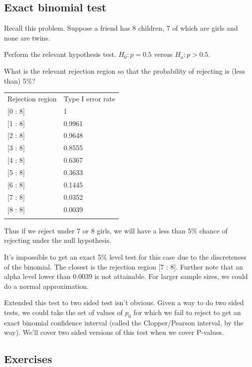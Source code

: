 \documentclass[]{article}
\begin{document}
\subsection{Exact binomial test}\label{exact-binomial-test}

Recall this problem. Suppose a friend has 8 children, 7 of which are
girls and none are twins.

Perform the relevant hypothesis test. $H_0 : p = 0.5$ versus
$H_a : p > 0.5$.

What is the relevant rejection region so that the probability of
rejecting is (less than) 5\%?

\begin{longtable}[c]{@{}ll@{}}
\toprule\addlinespace
Rejection region & Type I error rate
\\\addlinespace
\midrule\endhead
{[}0 : 8{]} & 1
\\\addlinespace
{[}1 : 8{]} & 0.9961
\\\addlinespace
{[}2 : 8{]} & 0.9648
\\\addlinespace
{[}3 : 8{]} & 0.8555
\\\addlinespace
{[}4 : 8{]} & 0.6367
\\\addlinespace
{[}5 : 8{]} & 0.3633
\\\addlinespace
{[}6 : 8{]} & 0.1445
\\\addlinespace
{[}7 : 8{]} & 0.0352
\\\addlinespace
{[}8 : 8{]} & 0.0039
\\\addlinespace
\bottomrule
\end{longtable}

Thus if we reject under 7 or 8 girls, we will have a less than 5\%
chance of rejecting under the null hypothesis.

It's impossible to get an exact 5\% level test for this case due to the
discreteness of the binomial. The closest is the rejection region {[}7 :
8{]}. Further note that an alpha level lower than 0.0039 is not
attainable. For larger sample sizes, we could do a normal approximation.

Extended this test to two sided test isn't obvious. Given a way to do
two sided tests, we could take the set of values of $p_0$ for which we
fail to reject to get an exact binomial confidence interval (called the
Clopper/Pearson interval, by the way). We'll cover two sided versions of
this test when we cover P-values.

\subsection{Exercises}\label{exercises-8}
\end{document}
